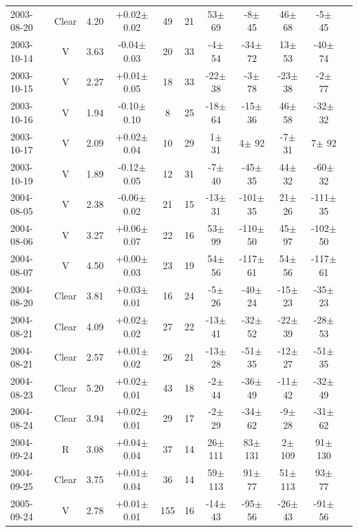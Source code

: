 \documentclass[12pt,a4paper]{report}
\begin{document}
\begin{landscape}
\begin{longtable}{|l|c|c|c|c|c|c|c|c|c|c|}
2003-08-20 & Clear & 4.20 & +0.02$\pm$0.02 &  49 &  21 &   53$\pm$ 69 &   -8$\pm$ 45 &   46$\pm$ 68 &   -5$\pm$ 45 \\ 
2003-10-14 & V     & 3.63 & -0.04$\pm$0.03 &  20 &  33 &   -4$\pm$ 54 &  -34$\pm$ 72 &   13$\pm$ 53 &  -40$\pm$ 74 \\ 
2003-10-15 & V     & 2.27 & +0.01$\pm$0.05 &  18 &  33 &  -22$\pm$ 38 &   -3$\pm$ 78 &  -23$\pm$ 38 &   -2$\pm$ 77 \\ 
2003-10-16 & V     & 1.94 & -0.10$\pm$0.10 &   8 &  25 &  -18$\pm$ 64 &  -15$\pm$ 36 &   46$\pm$ 58 &  -32$\pm$ 32 \\ 
2003-10-17 & V     & 2.09 & +0.02$\pm$0.04 &  10 &  29 &    1$\pm$ 31 &    4$\pm$ 92 &   -7$\pm$ 31 &    7$\pm$ 92 \\ 
2003-10-19 & V     & 1.89 & -0.12$\pm$0.05 &  12 &  31 &   -7$\pm$ 40 &  -45$\pm$ 35 &   44$\pm$ 32 &  -60$\pm$ 32 \\ 
2004-08-05 & V     & 2.38 & -0.06$\pm$0.02 &  21 &  15 &  -13$\pm$ 31 & -101$\pm$ 35 &   21$\pm$ 26 & -111$\pm$ 35 \\ 
2004-08-06 & V     & 3.27 & +0.06$\pm$0.07 &  22 &  16 &   53$\pm$ 99 & -110$\pm$ 50 &   45$\pm$ 97 & -102$\pm$ 50 \\ 
2004-08-07 & V     & 4.50 & +0.00$\pm$0.03 &  23 &  19 &   54$\pm$ 56 & -117$\pm$ 61 &   54$\pm$ 56 & -117$\pm$ 61 \\ 
2004-08-20 & Clear & 3.81 & +0.03$\pm$0.01 &  16 &  24 &   -5$\pm$ 26 &  -40$\pm$ 24 &  -15$\pm$ 23 &  -35$\pm$ 23 \\ 
2004-08-21 & Clear & 4.09 & +0.02$\pm$0.02 &  27 &  22 &  -13$\pm$ 41 &  -32$\pm$ 52 &  -22$\pm$ 39 &  -28$\pm$ 53 \\ 
2004-08-21 & Clear & 2.57 & +0.01$\pm$0.02 &  26 &  21 &  -13$\pm$ 28 &  -51$\pm$ 35 &  -12$\pm$ 27 &  -51$\pm$ 35 \\ 
2004-08-23 & Clear & 5.20 & +0.02$\pm$0.01 &  43 &  18 &   -2$\pm$ 44 &  -36$\pm$ 49 &  -11$\pm$ 42 &  -32$\pm$ 49 \\ 
2004-08-24 & Clear & 3.94 & +0.02$\pm$0.01 &  29 &  17 &   -2$\pm$ 29 &  -34$\pm$ 62 &   -9$\pm$ 28 &  -31$\pm$ 62 \\ 
2004-09-24 & R     & 3.08 & +0.04$\pm$0.04 &  37 &  14 &   26$\pm$111 &   83$\pm$131 &    2$\pm$109 &   91$\pm$130 \\ 
2004-09-25 & Clear & 3.75 & +0.01$\pm$0.04 &  36 &  14 &   59$\pm$113 &   91$\pm$ 77 &   51$\pm$113 &   93$\pm$ 77 \\ 
2005-09-24 & V     & 2.78 & +0.01$\pm$0.01 & 155 &  16 &  -14$\pm$ 43 &  -95$\pm$ 56 &  -26$\pm$ 43 &  -91$\pm$ 56 \\ 

\end{longtable}
\end{landscape}
\end{document}

